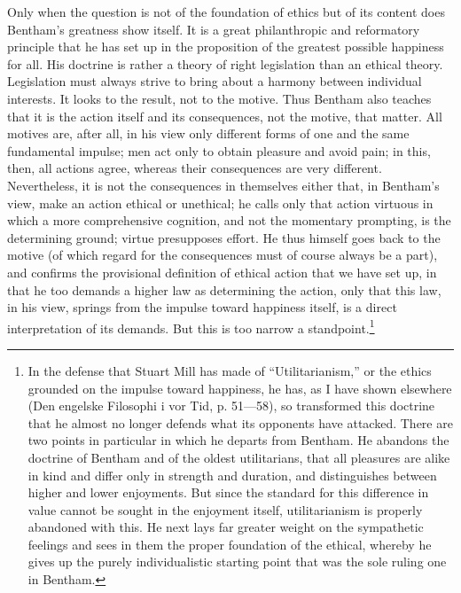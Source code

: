 \documentclass[12pt,a4paper,openany]{book}
\newcommand{\opage}[1]{\marginnote{\footnotesize\textit{[#1]}}}
\begin{document}
Only when the question is not of the foundation of ethics but of its content
does Bentham's greatness show itself. It is a great philanthropic and
reformatory principle that he has set up in the proposition of the greatest
possible happiness for all. His doctrine is rather a theory of right
legislation than \opage{29}an ethical theory. Legislation must always strive
to bring about a harmony between individual interests. It looks to the result,
not to the motive. Thus Bentham also teaches that it is the action itself and
its consequences, not the motive, that matter. All motives are, after all, in
his view only different forms of one and the same fundamental impulse; men act
only to obtain pleasure and avoid pain; in this, then, all actions agree,
whereas their consequences are very different. Nevertheless, it is not the
consequences in themselves either that, in Bentham's view, make an action
ethical or unethical; he calls only that action virtuous in which a more
comprehensive cognition, and not the momentary prompting, is the determining
ground; virtue presupposes effort. He thus himself goes back to the motive (of
which regard for the consequences must of course always be a part), and
confirms the provisional definition of ethical action that we have set up, in
that he too demands a higher law as determining the action, only that this
law, in his view, springs from the impulse toward happiness itself, is a
direct interpretation of its demands. But this is too narrow a
standpoint.\footnote[1]{In the defense that Stuart Mill has made of
``Utilitarianism,'' or the ethics grounded on the impulse toward happiness, he
has, as I have shown elsewhere (Den engelske Filosophi i vor Tid, p. 51---58),
so transformed this doctrine that he almost no longer defends what its
opponents have attacked. %
There are two points in particular in which he departs
from Bentham. He abandons the doctrine of Bentham and of the oldest
utilitarians, that all pleasures are alike in kind and differ only in strength
and duration, and distinguishes between higher and lower enjoyments. But since
the standard for this difference in value cannot be sought in the enjoyment
itself, utilitarianism is properly abandoned with this. He next lays far
greater weight on the sympathetic feelings and sees in them the proper
foundation of the ethical, whereby he gives up the purely individualistic
starting point that was the sole ruling one in Bentham.}
\end{document}
